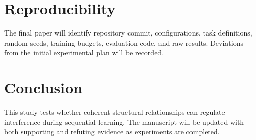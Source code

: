 \documentclass[11pt]{article}
\begin{document}
\section{Reproducibility}
The final paper will identify repository commit, configurations, task definitions, random seeds, training budgets, evaluation code, and raw results. Deviations from the initial experimental plan will be recorded.

\section{Conclusion}
This study tests whether coherent structural relationships can regulate interference during sequential learning. The manuscript will be updated with both supporting and refuting evidence as experiments are completed.
\end{document}
